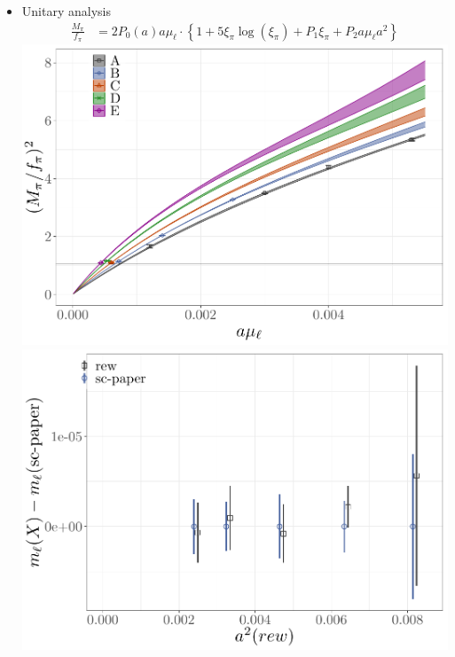 \documentclass[xcolor={dvipsnames,table}]{beamer}
\begin{document}
\begin{frame}
  \begin{itemize}
    \item Unitary analysis
          \begin{align*}
            \frac{M_\pi}{f_\pi} & = 2 P_0(a){a\mu}_{\ell}  \cdot \left\{ 1 + 5\xi_{\pi}\log(\xi_{\pi})+ P_1 \xi_\pi +  P_2 {a\mu}_{\ell} a^2\right\}
          \end{align*}
          \includegraphics[scale=0.5]{plots/Mpi_rew}
          \includegraphics[scale=0.5]{plots/ml_scaling}
  \end{itemize}
\end{frame}
\end{document}
